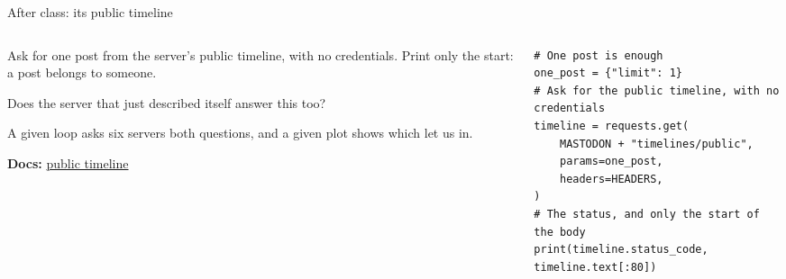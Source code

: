 \documentclass[9pt,aspectratio=169]{beamer}
\begin{document}
\begin{frame}[fragile]{After class: its public timeline}
    \begin{columns}[T]
        \begin{column}{0.37\textwidth}
            Ask for one post from the server's public timeline, with no credentials. Print only the start: a post belongs to someone.

            \medskip
            Does the server that just described itself answer this too?

            \medskip
            A given loop asks six servers both questions, and a given plot shows which let us in.

            \medskip
            {\scriptsize\textbf{Docs:} \href{https://docs.joinmastodon.org/methods/timelines/\#public}{public timeline}\par}
        \end{column}
        \begin{column}{0.6\textwidth}
\begin{lstlisting}[basicstyle=\ttfamily\footnotesize]
# One post is enough
one_post = {"limit": 1}
# Ask for the public timeline, with no credentials
timeline = requests.get(
    MASTODON + "timelines/public",
    params=one_post,
    headers=HEADERS,
)
# The status, and only the start of the body
print(timeline.status_code, timeline.text[:80])
\end{lstlisting}
        \end{column}
    \end{columns}
\end{frame}
\end{document}
